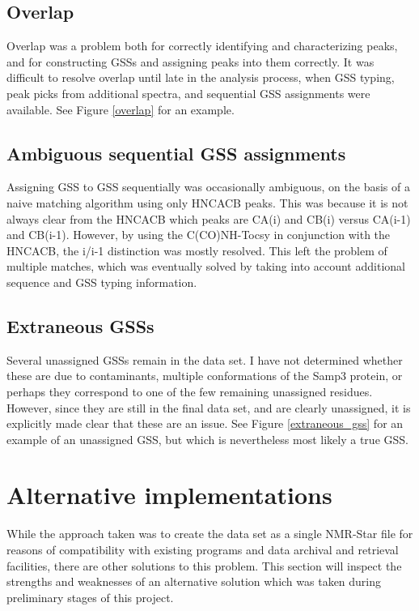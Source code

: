 \subsection{Overlap}
Overlap was a problem both for correctly identifying and characterizing peaks,
and for constructing GSSs and assigning peaks into them correctly.
It was difficult to resolve overlap until late in the analysis process, when
GSS typing, peak picks from additional spectra, and sequential GSS assignments
were available.
See Figure \ref{overlap} for an example.

\subsection{Ambiguous sequential GSS assignments}
Assigning GSS to GSS sequentially was occasionally ambiguous, on the basis of
a naive matching algorithm using only HNCACB peaks.  This was because it is
not always clear from the HNCACB which peaks are CA(i) and CB(i) versus CA(i-1)
and CB(i-1).  However, by using the C(CO)NH-Tocsy in conjunction with the
HNCACB, the i/i-1 distinction was mostly resolved.  This left the problem of
multiple matches, which was eventually solved by taking into account additional
sequence and GSS typing information.

\subsection{Extraneous GSSs}
Several unassigned GSSs remain in the data set.  I have not determined whether
these are due to contaminants, multiple conformations of the Samp3 protein,
or perhaps they correspond to one of the few remaining unassigned residues.
However, since they are still in the final data set, and are clearly unassigned,
it is explicitly made clear that these are an issue.
See Figure \ref{extraneous_gss} for an example of an unassigned GSS, but 
which is nevertheless most likely a true GSS.


\section{Alternative implementations}

While the approach taken was to create the data set as a single NMR-Star
file for reasons of compatibility with existing programs and data archival
and retrieval facilities, there are other solutions to this problem.  This
section will inspect the strengths and weaknesses of an alternative solution
which was taken during preliminary stages of this project.

